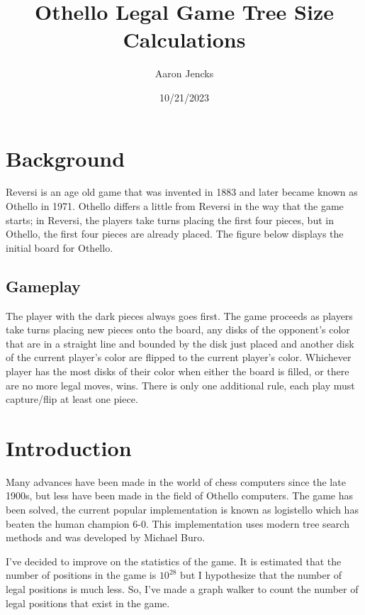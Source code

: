 \documentclass{article}
\title{Othello Legal Game Tree Size Calculations}
\author{Aaron Jencks}
\date{10/21/2023}
\begin{document}
\maketitle
\tableofcontents
\newpage

\section{Background}

Reversi is an age old game that was invented in 1883 and later became known as Othello in 1971. Othello differs a little from Reversi in the way that the game starts; in Reversi, the players take turns placing the first four pieces, but in Othello, the first four pieces are already placed. The figure below displays the initial board for Othello.\cite{wiki}

\begin{othelloboard}{0.5}
	\dotmarkings
\end{othelloboard}

\subsection{Gameplay}

The player with the dark pieces always goes first. The game proceeds as players take turns placing new pieces onto the board, any disks of the opponent's color that are in a straight line and bounded by the disk just placed and another disk of the current player's color are flipped to the current player's color. Whichever player has the most disks of their color when either the board is filled, or there are no more legal moves, wins. There is only one additional rule, each play must capture/flip at least one piece.\cite{wiki}

\section{Introduction}

Many advances have been made in the world of chess computers since the late 1900s, but less have been made in the field of Othello computers. The game has been solved, the current popular implementation is known as logistello which has beaten the human champion 6-0. This implementation uses modern tree search methods and was developed by Michael Buro.\cite{logistello}

I've decided to improve on the statistics of the game. It is estimated that the number of positions in the game is $10^{28}$ but I hypothesize that the number of legal positions is much less. So, I've made a graph walker to count the number of legal positions that exist in the game.\cite{wiki}
\end{document}

